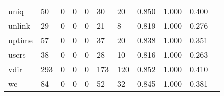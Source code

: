 \begin{longtable}{lp{1.2cm}p{1.2cm}p{1.2cm}p{1.2cm}p{1.2cm}p{1.2cm}p{1.2cm}p{1.2cm}p{1.2cm}p{1.2cm}}
uniq      &                                    50 &                                                  0 &                                                  0 &                                                  0 &                                                 30 &                                                 20 &                                         0.850 &                                              1.000 &                                              0.400 \\
unlink    &                                    29 &                                                  0 &                                                  0 &                                                  0 &                                                 21 &                                                  8 &                                         0.819 &                                              1.000 &                                              0.276 \\
uptime    &                                    57 &                                                  0 &                                                  0 &                                                  0 &                                                 37 &                                                 20 &                                         0.838 &                                              1.000 &                                              0.351 \\
users     &                                    38 &                                                  0 &                                                  0 &                                                  0 &                                                 28 &                                                 10 &                                         0.816 &                                              1.000 &                                              0.263 \\
vdir      &                                   293 &                                                  0 &                                                  0 &                                                  0 &                                                173 &                                                120 &                                         0.852 &                                              1.000 &                                              0.410 \\
wc        &                                    84 &                                                  0 &                                                  0 &                                                  0 &                                                 52 &                                                 32 &                                         0.845 &                                              1.000 &                                              0.381 \\

\end{longtable}
